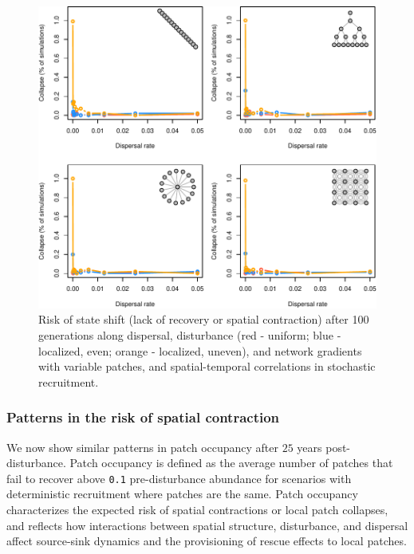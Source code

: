 \documentclass[
]{article}
\begin{document}
\begin{figure}[H]

{\centering \includegraphics{Managing_for_ecological_surprises_in_metapopulations_files/figure-latex/state shifts with variable patches and space-time stochasticity-1} 

}

\caption{Risk of state shift (lack of recovery or spatial contraction) after 100 generations along dispersal, disturbance (red - uniform; blue - localized, even; orange - localized, uneven), and network gradients with variable patches, and spatial-temporal correlations in stochastic recruitment.}\label{fig:state shifts with variable patches and space-time stochasticity}
\end{figure}

\newpage

\hypertarget{patterns-in-the-risk-of-spatial-contraction}{%
\subsubsection{Patterns in the risk of spatial
contraction}\label{patterns-in-the-risk-of-spatial-contraction}}

We now show similar patterns in patch occupancy after \(25\) years
post-disturbance. Patch occupancy is defined as the average number of
patches that fail to recover above \texttt{0.1} pre-disturbance
abundance for scenarios with deterministic recruitment where patches are
the same. Patch occupancy characterizes the expected risk of spatial
contractions or local patch collapses, and reflects how interactions
between spatial structure, disturbance, and dispersal affect source-sink
dynamics and the provisioning of rescue effects to local patches.
\end{document}
